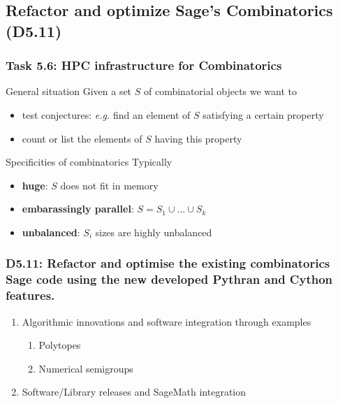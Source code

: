 \documentclass{beamer}
\begin{document}
\subsection{Refactor and optimize Sage's Combinatorics (D5.11)}
\begin{frame}
  \frametitle{Task 5.6: HPC infrastructure for Combinatorics}

  \begin{block}{General situation}
    Given a set $S$ of combinatorial objects we want to
    \begin{itemize}
    \item test conjectures: \textit{e.g.} find an element of $S$ satisfying a certain
      property
    \item count or list the elements of $S$ having this property
    \end{itemize}
  \end{block}

  \begin{block}{Specificities of combinatorics}
  Typically
    \begin{itemize}
    \item \textbf{huge}: $S$ does not fit in memory
    \item \textbf{embarassingly parallel}: $S = S_1 \cup \ldots \cup S_k$
    \item \textbf{unbalanced}: $S_i$ sizes are highly unbalanced
    \end{itemize}
  \end{block}
\end{frame}
\begin{frame}
  \frametitle{D5.11: Refactor and optimise the existing combinatorics Sage code using the new developed Pythran and Cython features.}

  \begin{enumerate}
  \item Algorithmic innovations and software integration through examples
  \begin{enumerate}
  \item Polytopes
  \item Numerical semigroups
  \end{enumerate}
  \item Software/Library releases and SageMath integration
  \end{enumerate}

\end{frame}
\end{document}
